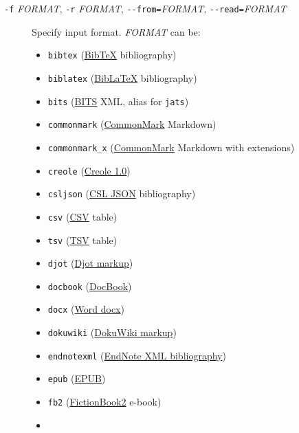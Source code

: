 \documentclass[
  b5paper
]{book}
\providecommand{\tightlist}{%
  \setlength{\itemsep}{0pt}\setlength{\parskip}{0pt}}
\begin{document}
\begin{description}
\item[\texttt{-f} \emph{FORMAT}, \texttt{-r} \emph{FORMAT},
\texttt{-\/-from=}\emph{FORMAT}, \texttt{-\/-read=}\emph{FORMAT}]
Specify input format. \emph{FORMAT} can be:

\label{input-formats}
\begin{itemize}
\tightlist
\item
  \texttt{bibtex} (\href{https://ctan.org/pkg/bibtex}{BibTeX}
  bibliography)
\item
  \texttt{biblatex} (\href{https://ctan.org/pkg/biblatex}{BibLaTeX}
  bibliography)
\item
  \texttt{bits} (\href{https://jats.nlm.nih.gov/extensions/bits/}{BITS}
  XML, alias for \texttt{jats})
\item
  \texttt{commonmark} (\href{https://commonmark.org}{CommonMark}
  Markdown)
\item
  \texttt{commonmark\_x} (\href{https://commonmark.org}{CommonMark}
  Markdown with extensions)
\item
  \texttt{creole}
  (\href{http://www.wikicreole.org/wiki/Creole1.0}{Creole 1.0})
\item
  \texttt{csljson}
  (\href{https://citeproc-js.readthedocs.io/en/latest/csl-json/markup.html}{CSL
  JSON} bibliography)
\item
  \texttt{csv} (\href{https://tools.ietf.org/html/rfc4180}{CSV} table)
\item
  \texttt{tsv}
  (\href{https://www.iana.org/assignments/media-types/text/tab-separated-values}{TSV}
  table)
\item
  \texttt{djot} (\href{https://djot.net}{Djot markup})
\item
  \texttt{docbook} (\href{https://docbook.org}{DocBook})
\item
  \texttt{docx}
  (\href{https://en.wikipedia.org/wiki/Office_Open_XML}{Word docx})
\item
  \texttt{dokuwiki} (\href{https://www.dokuwiki.org/dokuwiki}{DokuWiki
  markup})
\item
  \texttt{endnotexml}
  (\href{https://support.clarivate.com/Endnote/s/article/EndNote-XML-Document-Type-Definition}{EndNote
  XML bibliography})
\item
  \texttt{epub} (\href{http://idpf.org/epub}{EPUB})
\item
  \texttt{fb2}
  (\href{http://www.fictionbook.org/index.php/Eng:XML_Schema_Fictionbook_2.1}{FictionBook2}
  e-book)
\item

\end{itemize}
\end{description}
\end{document}
